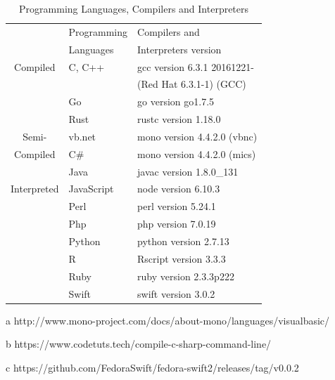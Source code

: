 \begin{table}
	\begin{threeparttable}
		\caption{Programming Languages, Compilers and Interpreters}
		\label{Languages_Compilers_and_Interpreters}
		\begin{tabular}{cll}
			\toprule
			& Programming  & Compilers and  \\
			& Languages  &  Interpreters version\\
			\midrule
			Compiled&C, C++	& gcc version 6.3.1 20161221- \\
			&		& (Red Hat 6.3.1-1) (GCC) \\
			&Go		& go version go1.7.5  \\
			&Rust	& rustc version 1.18.0 \\
			\midrule
			Semi-&{\sc vb.net} & mono version 4.4.2.0 (vbnc)\tnote{a} \\
			Compiled&C\#		& mono version 4.4.2.0 (mics)\tnote{b} \\
			&Java	& javac version 1.8.0\_131 \\
			\midrule
			Interpreted&JavaScript & node version 6.10.3 \\
			&Perl	& perl version 5.24.1 \\
			&Php		& php version 7.0.19 \\
			&Python	& python version 2.7.13 \\
			&R		& Rscript version 3.3.3 \\
			&Ruby	& ruby version 2.3.3p222 \\
			
			&Swift 	& swift version 3.0.2\tnote{c} \\
			
			\bottomrule
		\end{tabular}
		\begin{tablenotes}
			\begin{small}
				\item[a] {http://www.mono-project.com/docs/about-mono/languages/visualbasic/}
				\item[b] {https://www.codetuts.tech/compile-c-sharp-command-line/}
				\item[c] {https://github.com/FedoraSwift/fedora-swift2/releases/tag/v0.0.2}
			\end{small}
		\end{tablenotes}
	\end{threeparttable}
\end{table}

